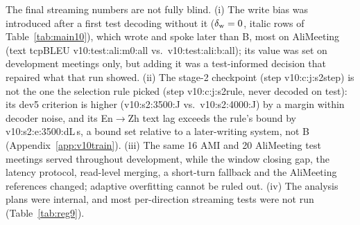 The final streaming numbers are not fully blind. (i) The write bias was introduced after a first test decoding without
it ($\delta_{\mathrm{w}}=0$, italic rows of Table~\ref{tab:main10}), which wrote and spoke later than B, most on AliMeeting (text
tcpBLEU \num{v10:test:ali:m0:all} vs.\ \num{v10:test:ali:b:all}); its value was set on development meetings only, but
adding it was a test-informed decision that repaired what that run showed. (ii) The stage-2 checkpoint (step \num{v10:c:j:s2step}) is not the one the selection rule picked (step
\num{v10:c:j:s2rule}, never decoded on test): its dev5 criterion is higher (\num{v10:s2:3500:J} vs.\
\num{v10:s2:4000:J}) by a margin within decoder noise, and its En$\rightarrow$Zh text lag exceeds the rule's bound by
\num{v10:s2:e:3500:dL}\,s, a bound set relative to a later-writing system, not B (Appendix~\ref{app:v10train}). (iii) The same 16 AMI and 20
AliMeeting test meetings served throughout development, while the window closing gap, the latency protocol, read-level
merging, a short-turn fallback and the AliMeeting references changed; adaptive overfitting cannot be ruled out. (iv) The
analysis plans were internal, and most per-direction streaming tests were not run (Table~\ref{tab:reg9}).
